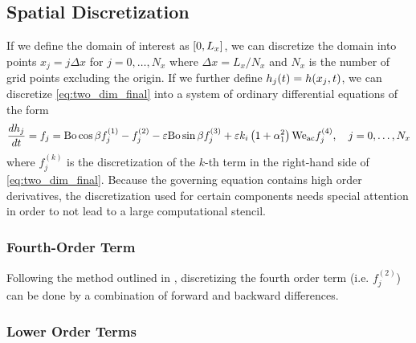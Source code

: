 \subsection{Spatial Discretization}
If we define the domain of interest as $\left[ 0, L_x \right]$, we can discretize the 
domain into points $x_j = j\Delta x$ for $j = 0, \ldots, N_x$ where 
$\Delta x = L_x / N_x$ and $N_x$ is the number of grid points excluding the origin. 
If we further define $h_j\!\left( t \right) = h\!\left( x_j, t \right)$, we can discretize 
\cref{eq:two_dim_final} into a system of ordinary differential equations of the form 
\begin{equation}
    \frac{d h_j}{d t} = f_j = \mathrm{Bo}\cos \beta f_j^{(1)} - f_j^{(2)} - \varepsilon \mathrm{Bo} \sin \beta f_j^{(3)} + \varepsilon k_i \left( 1 + \alpha_1^2 \right) \mathrm{We_{ac}} f_j^{(4)}, \quad j = 0, \ldots, N_x
    \label{eq:ode_sys}
\end{equation}
where $f_j^{(k)}$ is the discretization of the $k$-th term in
the right-hand side of \cref{eq:two_dim_final}. Because the governing equation 
contains high order derivatives, the discretization used for certain components 
needs special attention in order to not lead to a large computational stencil.

\subsubsection{Fourth-Order Term}
Following the method outlined in \cite{kondic2003instabilities}, discretizing the fourth order term (i.e.\! $f_j^{(2)}$) can be done by a combination
of forward and backward differences. 

\subsubsection{Lower Order Terms}
